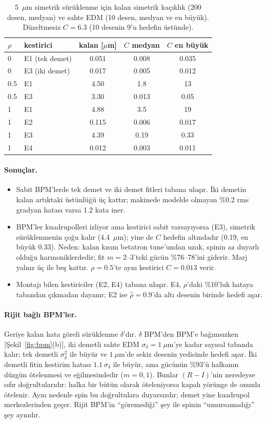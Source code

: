 \documentclass[11pt,a4paper]{article}
\begin{document}
\begin{table}[H]\centering\small
\caption{5~$\mu$m simetrik sürüklenme için kalan simetrik kaçıklık (200 desen, medyan) ve sahte EDM
(10 desen, medyan ve en büyük). Düzeltmesiz $C=6.3$ (10 desenin 9'u hedefin üstünde).}\label{tab:bpm}
\begin{tabular}{llccc}\toprule
$\rho$ & kestirici & kalan [$\mu$m] & $C$ medyan & $C$ en büyük\\\midrule
0 & E1 (tek demet) & 0.051 & 0.008 & 0.035\\
0 & E3 (iki demet) & 0.017 & 0.005 & 0.012\\
0.5 & E1 & 4.50 & 1.8 & 13\\
0.5 & E3 & 3.30 & 0.013 & 0.05\\
1 & E1 & 4.88 & 3.5 & 19\\
1 & E2 & 0.115 & 0.006 & 0.017\\
1 & E3 & 4.39 & 0.19 & 0.33\\
1 & E4 & 0.012 & 0.003 & 0.011\\\bottomrule
\end{tabular}
\end{table}

\paragraph{Sonuçlar.}
\begin{itemize}
\item Sabit BPM'lerde tek demet ve iki demet fitleri tabana ulaşır. İki demetin kalan artıktaki üstünlüğü üç
kattır; makinede modelde olmayan \%0.2 rms gradyan hatası varsa 1.2 kata iner.
\item BPM'ler kuadrupolleri izliyor ama kestirici sabit varsayıyorsa (E3), simetrik sürüklenmenin çoğu kalır
(4.4~$\mu$m); yine de $C$ hedefin altındadır (0.19, en büyük 0.33). Neden: kalan kısım betatron tune'undan uzak,
spinin az duyarlı olduğu harmoniklerdedir; fit $m=2$--3'teki gücün \%76--78'ini giderir. Marj yalnız üç ile
beş kattır. $\rho=0.5$'te aynı kestirici $C=0.013$ verir.
\item Montajı bilen kestiriciler (E2, E4) tabana ulaşır. E4, $\rho$'daki \%10'luk hataya tabandan çıkmadan
dayanır; E2 ise $\hat\rho=0.9$'da altı desenin birinde hedefi aşar.
\end{itemize}

\paragraph{Rijit bağlı BPM'ler.} Geriye kalan hata göreli sürüklenme $\delta$'dır. $\delta$ BPM'den BPM'e
bağımsızken [Şekil~\ref{fig:bpm}(b)], iki demetli sahte EDM $\sigma_\delta=1~\mu$m'ye kadar sayısal tabanda kalır;
tek demetli $\sigma_\delta^2$ ile büyür ve $1~\mu$m'de sekiz desenin yedisinde hedefi aşar. İki demetli fitin
kestirim hatası $1.1\,\sigma_\delta$ ile büyür, ama gücünün \%93'ü halkanın düzgün ötelenmesi ve eğilmesindedir
($m=0,1$). Bunlar $(R-I)$'nin neredeyse sıfır doğrultularıdır: halka bir bütün olarak öteleniyorsa kapalı yörünge
de onunla ötelenir. Aynı nedenle spin bu doğrultulara duyarsızdır; demet yine kuadrupol merkezlerinden geçer.
Rijit BPM'in ``göremediği'' şey ile spinin ``umursamadığı'' şey aynıdır.
\end{document}
